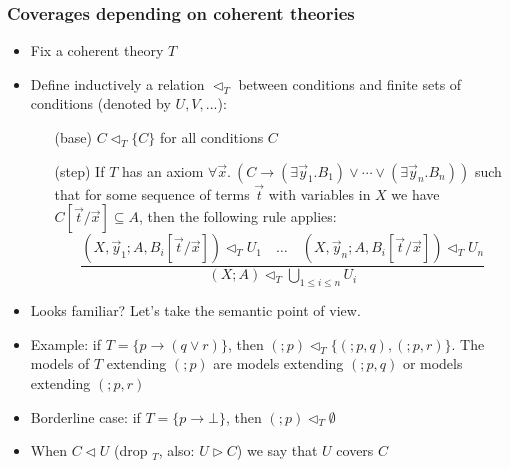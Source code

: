 \documentclass[handout,11pt]{beamer}
\newcommand{\set}[1]{\{#1\}}
\newcommand{\es}{\emptyset}
\newcommand{\covd}{\mathrel{\vartriangleleft}}
\newcommand{\covs}{\mathrel{\vartriangleright}}
\newcommand{\covT}{\mathrel{\vartriangleleft_T}}
\begin{document}
\begin{frame}
\frametitle{Coverages depending on coherent theories}
 \begin{itemize}[<+->]   %
  \item Fix a coherent theory $T$
  \item Define inductively a relation $\covT$ between
  conditions and finite sets of conditions (denoted by $U,V,...$):    
   \begin{enumerate}
    \item[(base)] $C\covT\set{C}$ for all conditions $C$
    \item[(step)] If $T$ has an axiom $\forall\vec{x}.~
    (C \to (\exists\vec{y}_1.B_1) \lor \cdots \lor (\exists\vec{y}_n.B_n))$
    such that for some sequence of terms $\vec{t}$ with variables in $X$
    we have $C[\vec{t}/\vec{x}] \subseteq A$, then the following rule applies:   
\[
\frac{(X,\vec y_1; A,B_i[\vec{t}/\vec{x}]) \covT U_1 \quad \ldots
\quad (X,\vec y_n; A,B_i[\vec{t}/\vec{x}]) \covT U_n}
{(X;A) \covT \bigcup_{1\leq i\leq n} U_i}
\]
   \end{enumerate}
  \item Looks familiar? Let's take the semantic point of view.
  \item Example: if $T=\set{p\to(q\lor r)}$, 
  then $(;p)\covT\set{(;p,q),(;p,r)}$. The models of $T$ extending $(;p)$ are
  models extending $(;p,q)$ or models extending $(;p,r)$
  \item Borderline case: if $T=\set{p\to \bot}$, then $(;p)\covT\es$
  \item When $C \covd U$ (drop ${}_T$, also: $U \covs C$) 
  we say that $U$ covers $C$ 
 \end{itemize}
\end{frame}
\end{document}
